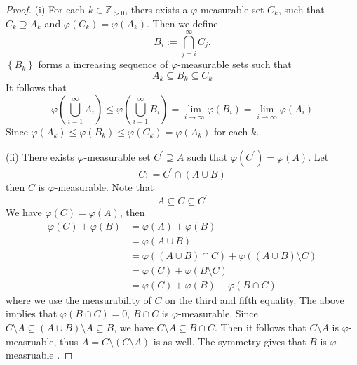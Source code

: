 \documentclass[../main.tex]{subfiles}
\begin{document}
\begin{proof}
    (i) For each \(  k\in \mathbb{Z} _{> 0}  \), thers exists a \( \varphi  \)-measurable set \(  C_{k}  \), such that \(  C_{k}\supseteq A_{k}  \) and \(   \varphi \left( C_{k} \right)=  \varphi \left( A_{k} \right)    \). Then we define \[
    B_{i}:= \bigcap _{j= i}^{\infty}C_{j}.
    \]\(  \left\{ B_{k} \right\}  \) forms a increasing sequence of \(   \varphi   \)-measurable sets such that  \[
    A_{k}\subseteq B_{k}\subseteq C_{k}
    \]It follows that \[
     \varphi \left( \bigcup _{i= 1}^{\infty}A_{i} \right)\le  \varphi \left( \bigcup _{i= 1}^{\infty}B_{i} \right)= \lim_{i\to \infty} \varphi \left( B_{i} \right)= \lim_{i\to \infty} \varphi \left( A_{i} \right)
    \] Since \(   \varphi \left( A_{k} \right)\le  \varphi \left( B_{k} \right)\le  \varphi \left( C_{k} \right)=  \varphi \left( A_{k} \right)      \)          for each \(  k  \). 
    
    (ii) There exists \(   \varphi   \)-measurable set \(  C^{\prime} \supseteq A  \) such that \(   \varphi \left( C^{\prime}  \right)=  \varphi \left( A \right)    \). Let \[
    C: =  C^{\prime} \cap \left( A\cup B \right) 
    \] then \(  C  \) is \(   \varphi   \)-measurable. Note that \[
    A\subseteq C\subseteq C^{\prime} 
    \]We have  \(   \varphi \left( C \right)=  \varphi \left( A \right)    \), then \[
    \begin{aligned}
     \varphi \left( C \right)+  \varphi \left( B \right)&=  \varphi \left( A \right)+  \varphi \left( B \right)\\ 
      &=  \varphi \left( A\cup B \right)\\ 
       &=  \varphi \left( \left( A\cup B \right)\cap C  \right)+  \varphi \left( \left( A\cup B \right)\setminus C  \right)\\ 
        &=  \varphi \left( C \right)+  \varphi \left( B\setminus C \right)\\ 
         &=  \varphi \left( C \right)+  \varphi \left( B \right)- \varphi \left( B\cap C \right)         
    \end{aligned}
    \] where we use the measurability of \(  C  \) on the third and fifth equality. The above implies that \(   \varphi \left( B\cap C \right)= 0   \), \(  B\cap C  \) is \(   \varphi   \)-measurable. Since \(  C\setminus A\subseteq \left( A\cup B \right)\setminus A\subseteq B   \), we have \(  C\setminus A\subseteq B\cap C   \). Then it follows that  \(  C\setminus A  \) is \(   \varphi   \)-measruable, thus \(  A= C\setminus \left( C\setminus A \right)   \) is as well. The symmetry  gives that \(  B  \) is \(   \varphi   \)-measruable .   
\end{proof}
\end{document}
